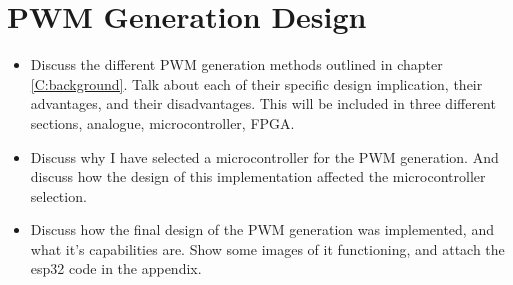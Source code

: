 \section{PWM Generation Design}\label{S:pwm_gen}

\begin{itemize}

    \item 
    Discuss the different PWM generation methods outlined in chapter \ref{C:background}. Talk about each of their specific design implication, their advantages, and their disadvantages. This will be included in three different sections, analogue, microcontroller, FPGA. 

    \item 
    Discuss why I have selected a microcontroller for the PWM generation. And discuss how the design of this implementation affected the microcontroller selection. 

    \item 
    Discuss how the final design of the PWM generation was implemented, and what it's capabilities are. Show some images of it functioning, and attach the esp32 code in the appendix.

\end{itemize}